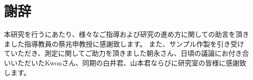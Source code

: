 \section*{謝辞}
本研究を行うにあたり、様々なご指導および研究の進め方に関しての助言を頂きました指導教員の蔡兆申教授に感謝致します。
また、サンプル作製を引き受けていただき、測定に関してご助力を頂きました朝永さん、日頃の議論にお付き合いいただいたKwonさん、同期の白井君、山本君ならびに研究室の皆様に感謝致します。
